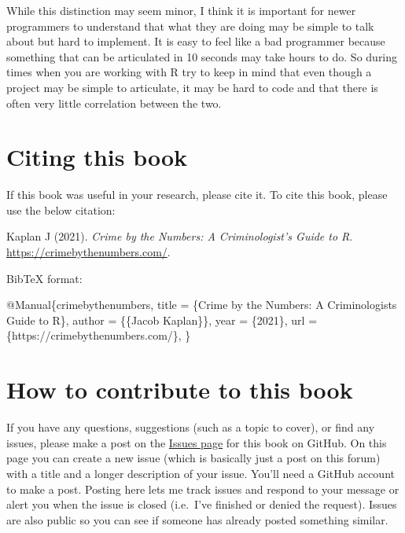 \documentclass[
  12pt,
  openany]{book}
\newenvironment{Shaded}{\begin{snugshade}}{\end{snugshade}}
\newcommand{\DataTypeTok}[1]{\textcolor[rgb]{0.27,0.27,0.27}{#1}}
\newcommand{\NormalTok}[1]{#1}
\newcommand{\OtherTok}[1]{\textcolor[rgb]{0.37,0.37,0.37}{#1}}
\newcommand{\VariableTok}[1]{\textcolor[rgb]{0,0,0}{#1}}
\begin{document}
While this distinction may seem minor, I think it is important for newer programmers to understand that what they are doing may be simple to talk about but hard to implement. It is easy to feel like a bad programmer because something that can be articulated in 10 seconds may take hours to do. So during times when you are working with R try to keep in mind that even though a project may be simple to articulate, it may be hard to code and that there is often very little correlation between the two.

\hypertarget{citing-this-book}{%
\section{Citing this book}\label{citing-this-book}}

If this book was useful in your research, please cite it. To cite this book, please use the below citation:

Kaplan J (2021). \emph{Crime by the Numbers: A Criminologist's Guide to R}. \url{https://crimebythenumbers.com/}.

BibTeX format:

\begin{Shaded}
\begin{Highlighting}[]
\VariableTok{@Manual}\NormalTok{\{}\OtherTok{crimebythenumbers}\NormalTok{,}
  \DataTypeTok{title}\NormalTok{ = \{Crime by the Numbers: A Criminologist\textquotesingle{}s Guide to R\},}
  \DataTypeTok{author}\NormalTok{ = \{\{Jacob Kaplan\}\},}
  \DataTypeTok{year}\NormalTok{ = \{2021\},}
  \DataTypeTok{url}\NormalTok{ = \{https://crimebythenumbers.com/\},}
\NormalTok{\}}
\end{Highlighting}
\end{Shaded}

\hypertarget{how-to-contribute-to-this-book}{%
\section{How to contribute to this book}\label{how-to-contribute-to-this-book}}

If you have any questions, suggestions (such as a topic to cover), or find any issues, please make a post on the \href{https://github.com/jacobkap/crimebythenumbers/issues}{Issues page} for this book on GitHub. On this page you can create a new issue (which is basically just a post on this forum) with a title and a longer description of your issue. You'll need a GitHub account to make a post. Posting here lets me track issues and respond to your message or alert you when the issue is closed (i.e.~I've finished or denied the request). Issues are also public so you can see if someone has already posted something similar.
\end{document}
